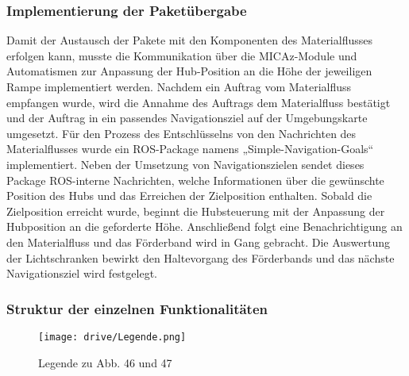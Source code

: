 \subsubsection{Implementierung der Paketübergabe}
Damit der Austausch der Pakete mit den Komponenten des Materialflusses erfolgen kann, musste die Kommunikation über die MICAz-Module und Automatismen zur Anpassung der Hub-Position an die Höhe der jeweiligen Rampe implementiert werden. Nachdem ein Auftrag vom Materialfluss empfangen wurde, wird die Annahme des Auftrags dem Materialfluss bestätigt und der Auftrag  in ein passendes Navigationsziel auf der Umgebungskarte umgesetzt.  Für den Prozess des Entschlüsselns von den Nachrichten des Materialflusses wurde ein ROS-Package namens „Simple-Navigation-Goals“ implementiert. Neben der Umsetzung von Navigationszielen sendet dieses Package ROS-interne Nachrichten, welche Informationen über die gewünschte Position des Hubs und das Erreichen der Zielposition enthalten.
Sobald die Zielposition erreicht wurde, beginnt die Hubsteuerung mit der Anpassung der Hubposition an die geforderte Höhe. Anschließend folgt eine Benachrichtigung an den Materialfluss und das Förderband wird in Gang gebracht. Die Auswertung der Lichtschranken bewirkt den Haltevorgang des Förderbands und das nächste Navigationsziel wird festgelegt.

\subsubsection{Struktur der einzelnen Funktionalitäten}



\begin{figure}[h!]
 \centering
		\texttt{[image: drive/Legende.png]}
	\caption{Legende zu Abb. 46 und 47}
	\label{fig:Legende}
\end{figure}


